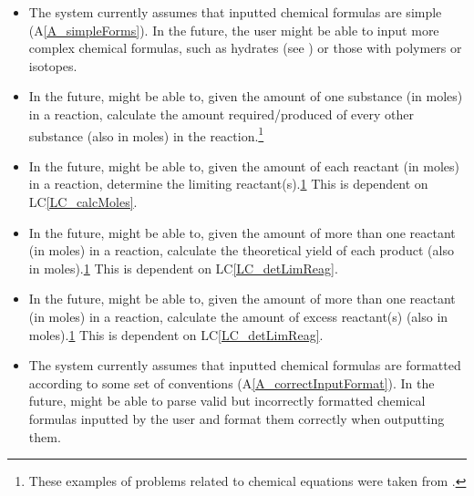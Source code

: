 \documentclass[12pt]{article}
\newcommand{\aref}[1]{A\ref{#1}}
\newcounter{lcnum} %
\newcommand{\lcref}[1]{LC\ref{#1}}
\begin{document}
\begin{itemize}

  \item[LC\refstepcounter{lcnum}\thelcnum\label{LC_complexForms}:] The system
    currently assumes that inputted chemical formulas are simple
    (\aref{A_simpleForms}). In the future, the user might
    be able to input more complex chemical formulas, such as hydrates (see
    ) or those with polymers or isotopes.

  \item[LC\refstepcounter{lcnum}\thelcnum\label{LC_calcMoles}:] In the future,
    \progname{} might be able to, given the amount of one substance (in moles)
    in a reaction, calculate the amount required/produced of every other
    substance (also in moles) in the reaction.\footnote{
      \label{chemProbExs}These examples of problems related to
      chemical equations were taken from \cite{lund_introduction_2023}.}

  \item[LC\refstepcounter{lcnum}\thelcnum\label{LC_detLimReag}:] In the future,
    \progname{} might be able to, given the amount
    of each reactant (in moles) in a reaction,
    determine the limiting reactant(s).\cref{chemProbExs}
    This is dependent on \lcref{LC_calcMoles}.

  \item[LC\refstepcounter{lcnum}\thelcnum\label{LC_calcYield}:] In the future,
    \progname{} might be able to, given the amount
    of more than one reactant (in moles) in a reaction,
    calculate the theoretical yield of each product (also in
    moles).\cref{chemProbExs} This is dependent on \lcref{LC_detLimReag}.

  \item[LC\refstepcounter{lcnum}\thelcnum\label{LC_calcExcess}:] In the future,
    \progname{} might be able to, given the amount
    of more than one reactant (in moles) in a reaction,
    calculate the amount of excess reactant(s) (also in	moles).\cref{chemProbExs}
    This is dependent on \lcref{LC_detLimReag}.

  \item[LC\refstepcounter{lcnum}\thelcnum\label{LC_incorrectInputFormat}:]
    The system currently assumes that inputted chemical formulas are formatted
    according to some set of conventions
    (\aref{A_correctInputFormat}). In the future, \progname{} might be able to
    parse valid but incorrectly formatted chemical formulas inputted by the
    user and format them correctly when outputting them.


\end{itemize}
\end{document}
